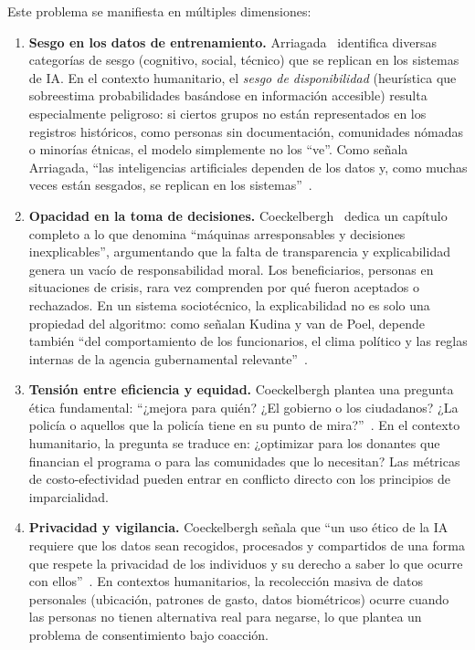 \documentclass[12pt, a4paper]{article}
\begin{document}
Este problema se manifiesta en múltiples dimensiones:

\begin{enumerate}[leftmargin=2em]
    \item \textbf{Sesgo en los datos de entrenamiento.} Arriagada~\cite{arriagada2024sesgos} identifica diversas categorías de sesgo (cognitivo, social, técnico) que se replican en los sistemas de IA. En el contexto humanitario, el \textit{sesgo de disponibilidad} (heurística que sobreestima probabilidades basándose en información accesible) resulta especialmente peligroso: si ciertos grupos no están representados en los registros históricos, como personas sin documentación, comunidades nómadas o minorías étnicas, el modelo simplemente no los ``ve''. Como señala Arriagada, ``las inteligencias artificiales dependen de los datos y, como muchas veces están sesgados, se replican en los sistemas''~\cite{arriagada2024sesgos}.

    \item \textbf{Opacidad en la toma de decisiones.} Coeckelbergh~\cite{coeckelbergh2021etica} dedica un capítulo completo a lo que denomina ``máquinas arresponsables y decisiones inexplicables'', argumentando que la falta de transparencia y explicabilidad genera un vacío de responsabilidad moral. Los beneficiarios, personas en situaciones de crisis, rara vez comprenden por qué fueron aceptados o rechazados. En un sistema sociotécnico, la explicabilidad no es solo una propiedad del algoritmo: como señalan Kudina y van de Poel, depende también ``del comportamiento de los funcionarios, el clima político y las reglas internas de la agencia gubernamental relevante''~\cite{kudina2024sociotechnical}.

    \item \textbf{Tensión entre eficiencia y equidad.} Coeckelbergh plantea una pregunta ética fundamental: ``¿mejora para quién? ¿El gobierno o los ciudadanos? ¿La policía o aquellos que la policía tiene en su punto de mira?''~\cite{coeckelbergh2021etica}. En el contexto humanitario, la pregunta se traduce en: ¿optimizar para los donantes que financian el programa o para las comunidades que lo necesitan? Las métricas de costo-efectividad pueden entrar en conflicto directo con los principios de imparcialidad.

    \item \textbf{Privacidad y vigilancia.} Coeckelbergh señala que ``un uso ético de la IA requiere que los datos sean recogidos, procesados y compartidos de una forma que respete la privacidad de los individuos y su derecho a saber lo que ocurre con ellos''~\cite{coeckelbergh2021etica}. En contextos humanitarios, la recolección masiva de datos personales (ubicación, patrones de gasto, datos biométricos) ocurre cuando las personas no tienen alternativa real para negarse, lo que plantea un problema de consentimiento bajo coacción.
\end{enumerate}
\end{document}
